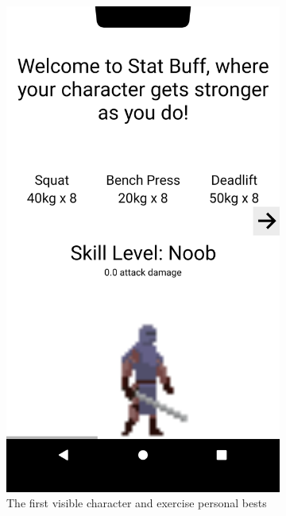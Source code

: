 \documentclass{l4proj}
\begin{document}
\begin{figure}[H]
    \begin{subfigure}{0.45\textwidth}
      \includegraphics[width=\textwidth]{noob.png}    
      \caption{The first visible character and exercise personal bests}
    \end{subfigure}
    \begin{subfigure}{0.45\textwidth}

\end{subfigure}
\end{figure}
\end{document}
